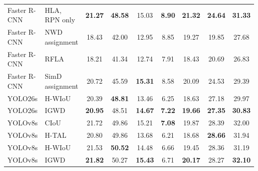 \documentclass[11pt,a4paper]{article}
\providecommand{\midrule}{\hline}
\providecommand{\bottomrule}{\hline}
\begin{document}
\begin{table}[t]
{\begin{tabular}{llccccccc}
    Faster R-CNN & HLA, RPN only  & \textbf{21.27} & \textbf{48.58} & 15.03 & \textbf{8.90} & \textbf{21.32} & \textbf{24.64} & \textbf{31.33} \\
    Faster R-CNN & NWD assignment  & 18.43 & 42.00 & 12.95 & 8.85 & 19.27 & 19.85 & 27.68 \\
    Faster R-CNN & RFLA  & 18.21 & 41.34 & 12.74 & 7.91 & 18.43 & 20.69 & 26.83 \\
    Faster R-CNN & SimD assignment  & 20.72 & 45.59 & \textbf{15.31} & 8.58 & 20.09 & 24.53 & 29.39 \\
    \midrule
    YOLO26s & H-WIoU  & 20.39 & \textbf{48.81} & 13.46 & 6.25 & 18.63 & 27.18 & 29.97 \\
    YOLO26s & IGWD  & \textbf{20.95} & 48.51 & \textbf{14.67} & \textbf{7.22} & \textbf{19.66} & \textbf{27.35} & \textbf{30.83} \\
    \midrule
    YOLOv8s & CIoU  & 21.72 & 49.86 & 15.21 & \textbf{7.08} & 19.87 & 28.39 & 32.00 \\
    YOLOv8s & H-TAL  & 20.80 & 49.86 & 13.68 & 6.21 & 18.68 & \textbf{28.66} & 31.94 \\
    YOLOv8s & H-WIoU  & 21.53 & \textbf{50.52} & 14.48 & 6.66 & 19.45 & 28.36 & 31.19 \\
    YOLOv8s & IGWD  & \textbf{21.82} & 50.27 & \textbf{15.43} & 6.71 & \textbf{20.17} & 28.27 & \textbf{32.10} \\
\bottomrule
\end{tabular}%
}\end{table}
\end{document}
